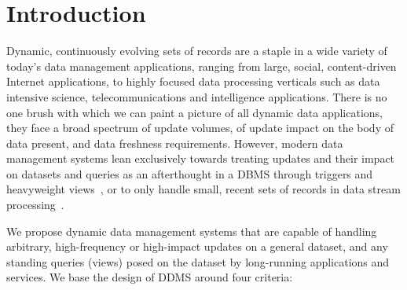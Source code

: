 





\section{Introduction}

Dynamic, continuously evolving sets of records are a staple in a wide variety of
today's data management applications, ranging from large, social, content-driven
Internet applications, to highly focused data processing verticals such as data
intensive science, telecommunications and intelligence applications. There is no
one brush with which we can paint a picture of all dynamic data applications,
they face a broad spectrum of update volumes, of update impact on the body of
data present, and data freshness requirements. However, modern data management
systems lean exclusively towards treating updates and their impact on datasets
and queries as an afterthought in a DBMS through triggers and heavyweight
views~\cite{griffin-sigmod:95,bello-vldb:98,zhou-icde:07,zhou-vldb:07}, or to
only handle small, recent sets of records in data stream
processing~\cite{abadi-vldbj:03, motwani-cidr:03, chandrasekaran-cidr:03,
demers-sigmod:07}.


We propose dynamic data management systems that are capable of handling
arbitrary, high-frequency or high-impact updates on a general dataset,
and any standing queries (views) posed on the dataset by long-running
applications and services. We base the design of DDMS around four criteria:

